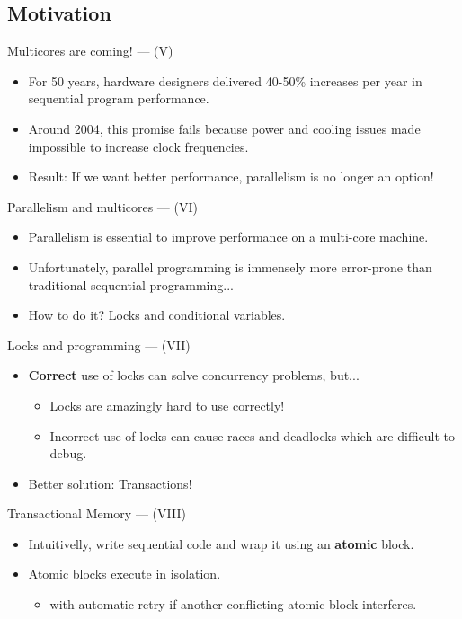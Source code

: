 \documentclass[14pt]{beamer}
\begin{document}
     \subsection{Motivation}
     \begin{frame}{Multicores are coming! --- (V)}
        \begin{itemize}
           \item For 50 years, hardware designers delivered 40-50\% increases per year in sequential program performance.
           \item Around 2004, this promise fails because power and cooling issues made impossible to increase clock
                 frequencies.
           \item Result: If we want better performance, parallelism is no longer an option!
        \end{itemize}
     \end{frame}
     \begin{frame}{Parallelism and multicores --- (VI)}
         \begin{itemize}
            \item Parallelism is essential to improve performance on a multi-core machine.
            \item Unfortunately, parallel programming is immensely more error-prone
                  than traditional sequential programming...
            \item How to do it? Locks and conditional variables.
         \end{itemize}
     \end{frame}
     \begin{frame}{Locks and programming --- (VII)}
        \begin{itemize}
           \item \textbf{Correct} use of locks can solve concurrency problems, but...
           \begin{itemize}
              \item Locks are amazingly hard to use correctly!
              \item Incorrect use of locks can cause races and deadlocks which
                    are difficult to debug.
           \end{itemize}
           \item Better solution: Transactions!
        \end{itemize}
     \end{frame}
     \begin{frame}{Transactional Memory --- (VIII)}
        \begin{itemize}
            \item Intuitivelly, write sequential code and wrap it using an \textbf{atomic} block.
            \item Atomic blocks execute in isolation.
            \begin{itemize}
               \item with automatic retry if another conflicting atomic block interferes.
            \end{itemize}
        \end{itemize}
     \end{frame}
\end{document}
